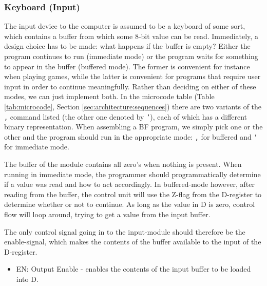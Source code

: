 \subsubsection{Keyboard (Input)} \label{sec:architecture:signals:input}
The input device to the computer is assumed to be a keyboard of some sort, which contains a buffer from which some 8-bit value can be read. Immediately, a design choice has to be made: what happens if the buffer is empty? Either the program continues to run (immediate mode) or the program waits for something to appear in the buffer (buffered mode). The former is convenient for instance when playing games, while the latter is convenient for programs that require user input in order to continue meaningfully. Rather than deciding on either of these modes, we can just implement both. In the microcode table (Table \ref{tab:microcode}, Section \ref{sec:architecture:sequences}) there are two variants of the \texttt{,} command listed (the other one denoted by \texttt{'}), each of which has a different binary representation. When assembling a BF program, we simply pick one or the other and the program should run in the appropriate mode: \texttt{,} for buffered and \texttt{'} for immediate mode.

The buffer of the module contains all zero's when nothing is present. When running in immediate mode, the programmer should programmatically determine if a value was read and how to act accordingly. In buffered-mode however, after reading from the buffer, the control unit will use the Z-flag from the D-register to determine whether or not to continue. As long as the value in D is zero, control flow will loop around, trying to get a value from the input buffer.

The only control signal going in to the input-module should therefore be the enable-signal, which makes the contents of the buffer available to the input of the D-register.
\begin{itemize}
\item EN: Output Enable - enables the contents of the input buffer to be loaded into D.
\end{itemize}

